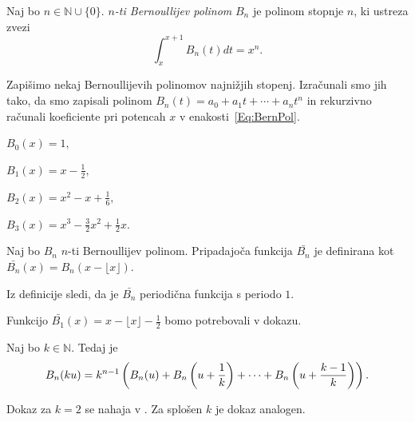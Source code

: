 \documentclass[mat1]{fmfdelo}
\begin{document}
\begin{definicija}
Naj bo $n \in \mathbb{N} \cup \{0\}.$ \emph{$n$-ti Bernoullijev polinom} $B_{n}$ je polinom stopnje $n$, ki ustreza zvezi
\begin{equation}
\label{Eq:BernPol}
\int_{x}^{x+1} B_{n}(t) dt = x^{n}.
\end{equation}
\end{definicija}

\begin{primer}
Zapišimo nekaj Bernoullijevih polinomov najnižjih stopenj. Izračunali smo jih tako, da smo zapisali polinom $B_{n}(t) = a_{0} + a_{1}t + \cdots + a_{n}t^{n}$ in rekurzivno računali koeficiente pri potencah $x$ v enakosti~\eqref{Eq:BernPol}.

\( B_{0}(x) = 1, \)

\( B_{1}(x) = x - \frac{1}{2}, \)

\( B_{2}(x) = x^2 - x + \frac{1}{6}, \)

\( B_{3}(x) = x^3 - \frac{3}{2} x^2 + \frac{1}{2} x. \)
\end{primer}

\begin{definicija}
Naj bo $B_{n}$ $n$-ti Bernoullijev polinom. Pripadajoča funkcija $ \bar{B_{n}} $ je definirana kot $ \bar{B_{n}}(x) = B_{n}(x - \lfloor x \rfloor). $
\end{definicija}

\begin{opomba}
Iz definicije sledi, da je $ \bar{B_{n}} $ periodična funkcija s periodo $1$.
\end{opomba}

\begin{primer}
Funkcijo $ \bar{B_{1}}(x) = x - \lfloor x \rfloor - \frac{1}{2} $ bomo potrebovali v dokazu.
\end{primer}

\begin{trditev}
Naj bo $k \in \mathbb{N}$. Tedaj je
\begin{equation}
\label{Eq:B_{n}(ku)}
B_{n}(ku) = k^{n-1} \left ( B_{n}(u) + B_{n} \left( u + \frac{1}{k} \right) + \cdots + B_{n} \left( u + \frac{k-1}{k} \right) \right).
\end{equation}
\end{trditev}

\begin{dokaz}
Dokaz za $k=2$ se nahaja v \cite[poglavje 6.2, str.~102 -- 103]{zetafunction}. Za splošen $k$ je dokaz analogen.
\end{dokaz}
\end{document}
